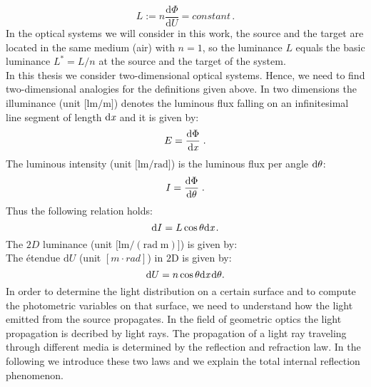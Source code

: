 \begin{equation}\label{basicluminance}
L := n \frac{\textrm{d}\Phi}{\textrm{d}U} = constant\,.
\end{equation}
 In the optical systems we will consider in this work, the source and the target are located in the same medium (air) with $n=1$, so the luminance $L$ equals the basic luminance $L^* = L/n$ at the source and the target of the system.\\
\indent In this thesis we consider two-dimensional optical systems. 
 Hence, we need to find two-dimensional analogies for the definitions given above.
In two dimensions the illuminance \big(unit $\big[\textrm{lm}/\textrm{m}\big]$\big) denotes the luminous flux falling on an infinitesimal line segment of length $\textrm{d}\textit{x}$ 
and it is given by:
 \begin{equation}
 E=\frac{\textrm{d}\Phi}{\textrm{d}\textit{x}}\;.
 \end{equation}
 The luminous intensity \big(unit $\big[\textrm{lm}/\textrm{rad}\big]$\big) is the luminous flux per angle $\textrm{d}\mbox{$\theta$}$:
 \begin{equation}
 I=\frac{\textrm{d}\Phi}{\textrm{d}\mbox{$\theta$}}\;.
 \end{equation}
 Thus the following relation holds:
 \begin{equation}
 \textrm{d}I = L\cos\mbox{$\theta$}\textrm{d}\textit{x}\,.
 \end{equation}
 The $2D$ luminance \big(unit $\big[\textrm{lm}/(\textrm{rad}\; \textrm{m})\big]$\big) is given by:
 \begin{equation}
 \end{equation}
  The \'{e}tendue $\textrm{d}U $ (unit $[m\cdot rad]$) in $2$D is given by:
\begin{equation}\label{etendue2d}
\textrm{d}U = n\cos\mbox{$\theta$}\textrm{d}\textit{x}\,\textrm{d}\mbox{$\theta$}.
\end{equation}
In order to determine the light distribution on a certain surface and to compute the photometric variables on that surface, we need to understand how the light emitted from the source propagates. In the field of geometric optics the light propagation is decribed by light rays.
The propagation of a light ray traveling through  different media is determined by the reflection and refraction law.
In the following we introduce these two laws and we explain the total internal reflection phenomenon.

